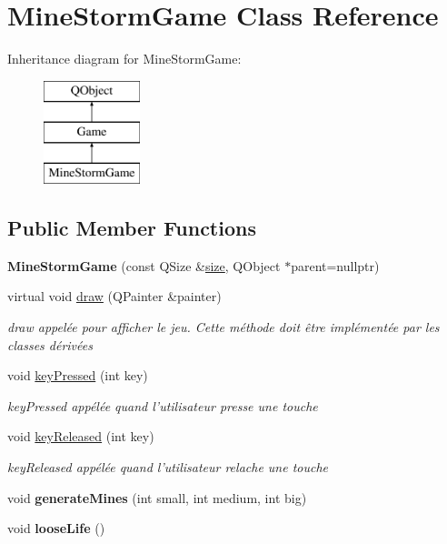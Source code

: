\hypertarget{classMineStormGame}{\section{Mine\-Storm\-Game Class Reference}
\label{classMineStormGame}
}
Inheritance diagram for Mine\-Storm\-Game\-:\begin{figure}[H]
\begin{center}
\leavevmode
\includegraphics[height=3.000000cm]{classMineStormGame}
\end{center}
\end{figure}
\subsection*{Public Member Functions}
\begin{DoxyCompactItemize}
\item 
\hypertarget{classMineStormGame_aacea8fd6a447213810e13d6a890b67e5}{{\bfseries Mine\-Storm\-Game} (const Q\-Size \&\hyperlink{classGame_aef028fef77b6498c42f347400b1ebf55}{size}, Q\-Object $\ast$parent=nullptr)}\label{classMineStormGame_aacea8fd6a447213810e13d6a890b67e5}

\item 
virtual void \hyperlink{classMineStormGame_ae801bdab673e8ef94a768937b489624d}{draw} (Q\-Painter \&painter)
\begin{DoxyCompactList}\small\item\em draw appelée pour afficher le jeu. Cette méthode doit être implémentée par les classes dérivées \end{DoxyCompactList}\item 
void \hyperlink{classMineStormGame_a242fd1067aad4a815fc0a8fe78a5fd58}{key\-Pressed} (int key)
\begin{DoxyCompactList}\small\item\em key\-Pressed appélée quand l'utilisateur presse une touche \end{DoxyCompactList}\item 
void \hyperlink{classMineStormGame_af5e32b922f1560cea7d5c45efcd2755e}{key\-Released} (int key)
\begin{DoxyCompactList}\small\item\em key\-Released appélée quand l'utilisateur relache une touche \end{DoxyCompactList}\item 
\hypertarget{classMineStormGame_a7539c30ebd76c380b02b7a670e82e63e}{void {\bfseries generate\-Mines} (int small, int medium, int big)}\label{classMineStormGame_a7539c30ebd76c380b02b7a670e82e63e}

\item 
\hypertarget{classMineStormGame_a65140f427616478dcb7d8e8c38bb03a2}{void {\bfseries loose\-Life} ()}\label{classMineStormGame_a65140f427616478dcb7d8e8c38bb03a2}

\end{DoxyCompactItemize}
